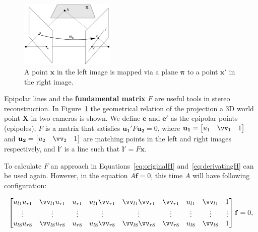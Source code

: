 \documentclass[12pt]{article}
\begin{document}

\begin{figure}[htbp!]
	\centering
	\includegraphics[width=0.4\textwidth]{images/epipolarLines}
	\caption{A point $\mathbf{x}$ in the left image is mapped via a plane $\boldsymbol{\pi}$ to a point $\mathbf{x}'$ in the right image.}\label{fig:epipolarLines}
\end{figure}

Epipolar lines and the \textbf{fundamental matrix} $F$ are useful tools in stereo reconstruction.
In Figure~\ref{fig:epipolarLines} the geometrical relation of the projection a 3D world point $\mathbf{X}$ in two cameras is shown.
We define $\mathbf{e}$ and $\mathbf{e}'$ as the epipolar points (epipoles), $F$ is a matrix that satisfies $\mathbf{u_1}'F\mathbf{u_2} = 0$, where $\mathbf{u_1} = \begin{bmatrix} u_1 & \vv_1 & 1 \end{bmatrix}$ and $\mathbf{u_2} = \begin{bmatrix} u_2 & \vv_2 & 1 \end{bmatrix}$ are matching points in the left and right images respectively, and $\mathbf{l}'$ is a line such that $\mathbf{l}' = F\mathbf{x}$.

To calculate $F$ an approach in Equations~\ref{eq:originalH} and~\ref{eq:derivatingH} can be used again.
However, in the equation $A\mathbf{f} = 0$, this time $A$ will have following configuration:

\begin{equation}
\begin{bmatrix}
u_{l1} u_{r1} & 	\vv_{l1} u_{r1} & u_{r1} & u_{l1} \vv_{r1} & \vv_{l1} \vv_{r1} & \vv_{r1} & u_{l1} & \vv_{l1} & 1 \\
\vdots & \vdots & \vdots & \vdots & \vdots & \vdots & \vdots & \vdots & \vdots  \\
u_{l8} u_{r8} & \vv_{l8} u_{r8} & u_{r8} & u_{l8} \vv_{r8} & \vv_{l8} \vv_{r8} & \vv_{r8} & u_{l8} & \vv_{l8} & 1 
\end{bmatrix}
\mathbf{f}
= 0,
\end{equation}
\end{document}
